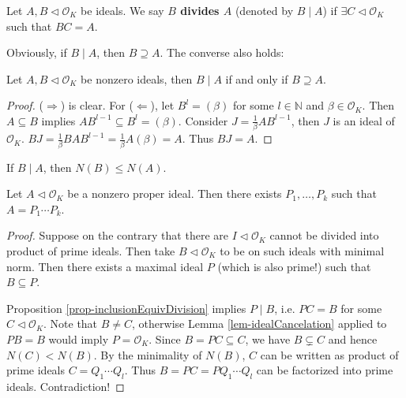\begin{definition}
    Let $A, B\lhd \mathcal{O}_{K}$ be ideals. We say {\bf $B$ divides $A$} (denoted by $B\mid A$) if $\exists C\lhd \mathcal{O}_{K}$ such that $BC=A$. 
\end{definition}

Obviously, if $B\mid A$, then $B\supseteq A$. The converse also holds: 

\begin{proposition}\label{prop-inclusionEquivDivision}
    Let $A,B\lhd \mathcal{O}_{K}$ be nonzero ideals, then $B\mid A$ if and only if $B\supseteq A$. 
\end{proposition}

\begin{proof}
    ($\Rightarrow$) is clear. For ($\Leftarrow$), let $B^{l}=(\beta)$ for some $l\in \mathbb{N}$ and $\beta\in \mathcal{O}_{K}$. Then $A\subseteq B$ implies $AB^{l-1}\subseteq B^{l}=(\beta)$. Consider $J=\frac{1}{\beta}AB^{l-1}$, then $J$ is an ideal of $\mathcal{O}_{K}$. $BJ=\frac{1}{\beta}BAB^{l-1}=\frac{1}{\beta}A(\beta)=A$. Thus $BJ=A$. 
\end{proof}

\begin{remark}
    If $B\mid A$, then $N(B)\leq N(A)$. 
\end{remark}

\begin{theorem}
    Let $A\lhd \mathcal{O}_{K}$ be a nonzero proper ideal. Then there exists $P_{1},\dots, P_{k}$ such that $A=P_{1}\cdots P_{k}$. 
\end{theorem}

\begin{proof}
    Suppose on the contrary that there are $I\lhd \mathcal{O}_{K}$ cannot be divided into product of prime ideals. Then take $B\lhd \mathcal{O}_{K}$ to be on such ideals with minimal norm. Then there exists a maximal ideal $P$ (which is also prime!) such that $B\subseteq P$.  

    Proposition \ref{prop-inclusionEquivDivision} implies $P\mid B$, i.e. $PC=B$ for some $C\lhd \mathcal{O}_{K}$. Note that $B\neq C$, otherwise Lemma \ref{lem-idealCancelation} applied to $PB=B$ would imply $P=\mathcal{O}_{K}$. Since $B=PC\subseteq C$, we have $B\subsetneq C$ and hence $N(C)<N(B)$. By the minimality of $N(B)$, $C$ can be written as product of prime ideals $C=Q_{1}\cdots Q_{l}$. Thus $B=PC=PQ_{1}\cdots Q_{l}$ can be factorized into prime ideals. Contradiction! 
\end{proof}

